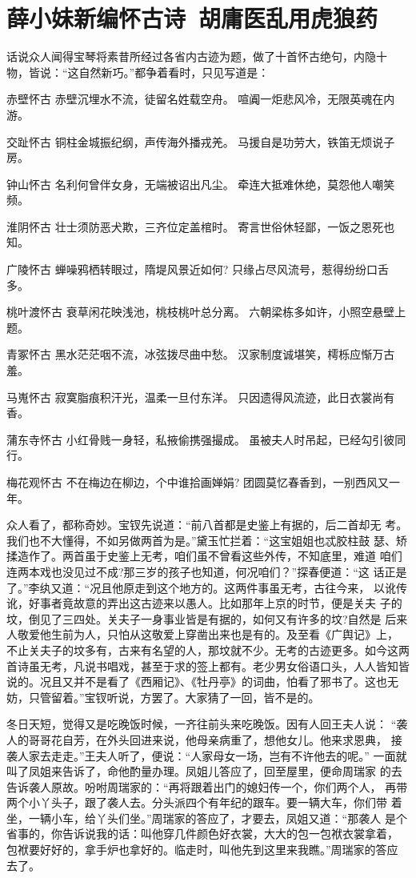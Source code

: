 \chapter{薛小妹新编怀古诗~胡庸医乱用虎狼药}

话说众人闻得宝琴将素昔所经过各省内古迹为题，做了十首怀古绝句，内隐十
物，皆说：“这自然新巧。”都争着看时，只见写道是：

赤壁怀古
赤壁沉埋水不流，徒留名姓载空舟。
喧阗一炬悲风冷，无限英魂在内游。

交趾怀古
铜柱金城振纪纲，声传海外播戎羌。
马援自是功劳大，铁笛无烦说子房。

钟山怀古
名利何曾伴女身，无端被诏出凡尘。
牵连大抵难休绝，莫怨他人嘲笑频。

淮阴怀古
壮士须防恶犬欺，三齐位定盖棺时。
寄言世俗休轻鄙，一饭之恩死也知。

广陵怀古
蝉噪鸦栖转眼过，隋堤风景近如何?
只缘占尽风流号，惹得纷纷口舌多。

桃叶渡怀古
衰草闲花映浅池，桃枝桃叶总分离。
六朝梁栋多如许，小照空悬壁上题。

青冢怀古
黑水茫茫咽不流，冰弦拨尽曲中愁。
汉家制度诚堪笑，樗栎应惭万古羞。

马嵬怀古
寂寞脂痕积汗光，温柔一旦付东洋。
只因遗得风流迹，此日衣裳尚有香。

蒲东寺怀古
小红骨贱一身轻，私掖偷携强撮成。
虽被夫人时吊起，已经勾引彼同行。

梅花观怀古
不在梅边在柳边，个中谁拾画婵娟?
团圆莫忆春香到，一别西风又一年。

众人看了，都称奇妙。宝钗先说道：“前八首都是史鉴上有据的，后二首却无
考。我们也不大懂得，不如另做两首为是。”黛玉忙拦着：“这宝姐姐也忒胶柱鼓
瑟、矫揉造作了。两首虽于史鉴上无考，咱们虽不曾看这些外传，不知底里，难道
咱们连两本戏也没见过不成?那三岁的孩子也知道，何况咱们？”探春便道：“这
话正是了。”李纨又道：“况且他原走到这个地方的。这两件事虽无考，古往今来，
以讹传讹，好事者竟故意的弄出这古迹来以愚人。比如那年上京的时节，便是关夫
子的坟，倒见了三四处。关夫子一身事业皆是有据的，如何又有许多的坟?自然是
后来人敬爱他生前为人，只怕从这敬爱上穿凿出来也是有的。及至看《广舆记》上，
不止关夫子的坟多有，古来有名望的人，那坟就不少。无考的古迹更多。如今这两
首诗虽无考，凡说书唱戏，甚至于求的签上都有。老少男女俗语口头，人人皆知皆
说的。况且又并不是看了《西厢记》、《牡丹亭》的词曲，怕看了邪书了。这也无
妨，只管留着。”宝钗听说，方罢了。大家猜了一回，皆不是的。

冬日天短，觉得又是吃晚饭时候，一齐往前头来吃晚饭。因有人回王夫人说：
“袭人的哥哥花自芳，在外头回进来说，他母亲病重了，想他女儿。他来求恩典，
接袭人家去走走。”王夫人听了，便说：“人家母女一场，岂有不许他去的呢。”
一面就叫了凤姐来告诉了，命他酌量办理。凤姐儿答应了，回至屋里，便命周瑞家
的去告诉袭人原故。吩咐周瑞家的：“再将跟着出门的媳妇传一个，你们两个人，
再带两个小丫头子，跟了袭人去。分头派四个有年纪的跟车。要一辆大车，你们带
着坐，一辆小车，给丫头们坐。”周瑞家的答应了，才要去，凤姐又道：“那袭人
是个省事的，你告诉说我的话：叫他穿几件颜色好衣裳，大大的包一包袱衣裳拿着，
包袱要好好的，拿手炉也拿好的。临走时，叫他先到这里来我瞧。”周瑞家的答应
去了。

